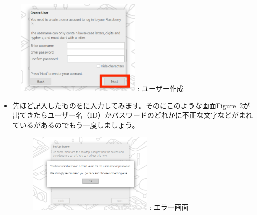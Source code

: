 \documentclass[a4paper,12pt]{jarticle}
\begin{document}
\begin{enumerate}
\begin{itemize}
        
                    \begin{figure}[h]
                      \centering
                      \begin{minipage}{5.228cm}
                        {\upshape
                          \includegraphics[width=6.000cm]{sw_image03.png}
                          \newline
                          {\theFigure\label{seq:refFigure11}}:
                          ユーザー作成}
                      \end{minipage}
                    \end{figure}
                  \end{itemize}
                  \begin{itemize}
                  \item
                      先ほど記入したものをに入力してみます。そのにこのような画面Figure~\ref{seq:refFigure14}が出てきたらユーザー名（ID）かパスワードのどれかに不正な文字などがまれているがあるのでもう一度しましょう。
                      \begin{figure}[h]
                        \centering
                        \begin{minipage}{5.228cm}
                          {\upshape
                            \includegraphics[width=6.000cm]{sw_image04.png}
                            \newline
                            {\theFigure\label{seq:refFigure14}}:
                            エラー画面}
                        \end{minipage}

\end{figure}
\end{itemize}
\end{enumerate}
\end{document}
